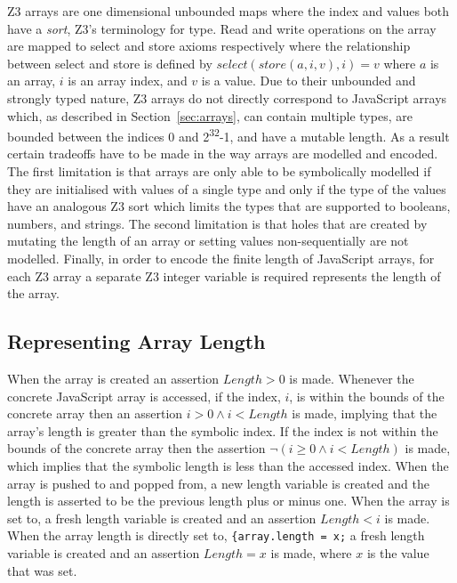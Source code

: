 \documentclass[]{final_report}
\begin{document}
Z3 arrays are one dimensional unbounded maps where the index and values both have a \textit{sort}, Z3's terminology for type. Read and write operations on the array are mapped to select and store axioms respectively where the relationship between select and store is defined by $select(store(a, i, v), i) = v$ where $a$ is an array, $i$ is an array index, and $v$ is a value. Due to their unbounded and strongly typed nature, Z3 arrays do not directly correspond to JavaScript arrays which, as described in Section~\ref{sec:arrays}, can contain multiple types, are bounded between the indices 0 and 2\textsuperscript{32}-1, and have a mutable length. As a result certain tradeoffs have to be made in the way arrays are modelled and encoded. The first limitation is that arrays are only able to be symbolically modelled if they are initialised with values of a single type and only if the type of the values have an analogous Z3 sort which limits the types that are supported to booleans, numbers, and strings. The second limitation is that holes that are created by mutating the length of an array or setting values non-sequentially are not modelled. Finally, in order to encode the finite length of JavaScript arrays, for each Z3 array a separate Z3 integer variable is required represents the length of the array. 

\subsection{Representing Array Length}
When the array is created an assertion $Length > 0$ is made. Whenever the concrete JavaScript array is accessed, if the index, $i$, is within the bounds of the concrete array then an assertion $i > 0 \land i < Length$ is made, implying that the array's length is greater than the symbolic index. If the index is not within the bounds of the concrete array then the assertion $\lnot{(i \geq 0 \land i < Length)}$ is made, which implies that the symbolic length is less than the accessed index. When the array is pushed to and popped from, a new length variable is created and the length is asserted to be the previous length plus or minus one. When the array is set to, a fresh length variable is created and an assertion $Length < i$ is made. When the array length is directly set to, \lstinline|{array.length = x;| a fresh length variable is created and an assertion $Length = x$ is made, where $x$ is the value that was set.
\end{document}
